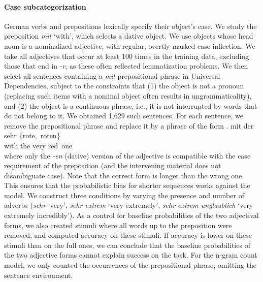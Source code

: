 \paragraph{Case subcategorization}
German verbs and prepositions lexically specify their object's case.  We
study the preposition \textit{mit} `with', which selects a dative
object. We use objects whose head noun is a nominalized adjective,
with regular, overtly marked case inflection.  We take all adjectives
that occur at least 100 times in the training data, excluding those
that end in -\emph{r}, as these often reflected lemmatization
problems. We then select all sentences containing a \emph{mit}
prepositional phrase in Universal Dependencies, subject to the
constraints that (1) the object is not a pronoun (replacing such items with a
nominal object often results in ungrammaticality), and (2) the object
is a continuous phrase, i.e., it is not interrupted by words that do
not belong to it. %
We obtained 1,629 such sentences.  For each sentence, we remove the
prepositional phrase and replace it by a phrase of the form
\exg. mit der sehr \{rote,\ \underline{roten}\} \\
with the very red\ one \\

where only the \emph{-en} (dative) version of the adjective is
compatible with the case requirement of the preposition (and the
intervening material does not disambiguate case). Note that the
correct form is longer than the wrong one. This ensures that the
probabilistic bias for shorter sequences works against the model.  We
construct three conditions by varying the presence and number of
adverbs (\emph{sehr} `very', \emph{sehr extrem} `very extremely',
\emph{sehr extrem unglaublich} `very extremely incredibly').  As a
control for baseline probabilities of the two adjectival forms, we
also created stimuli where all words up to the preposition were
removed, and computed accuracy on these stimuli.  If accuracy is lower
on these stimuli than on the full ones, we can conclude that the
baseline probabilities of the two adjective forms cannot explain
success on the task. For the n-gram count model, we only counted the
occurrences of the prepositional phrase, omitting the sentence
environment.

